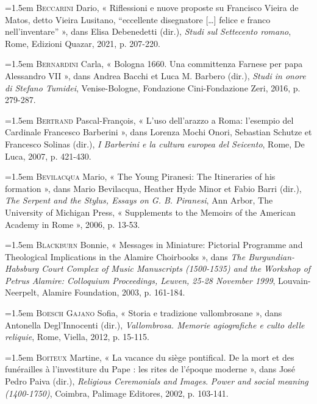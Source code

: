 \documentclass[12pt,twoside,openany]{book}
\newenvironment{PurhBibliography}
  {%
    \par
    \setlength{\parindent}{0pt}%
    \setlength{\leftskip}{0pt}%
  }
  {%
    \par
  }
\begin{document}
\begin{PurhBibliography}
\noindent\hangindent=1.5em \textsc{Beccarini} Dario, « Riflessioni e nuove proposte su Francisco Vieira de Matos, detto Vieira Lusitano, “eccellente disegnatore […] felice e franco nell’inventare” », dans Elisa Debenedetti (dir.), \textit{Studi sul Settecento romano}, Rome, Edizioni Quazar, 2021, p. 207-220.\par
\noindent\hangindent=1.5em \textsc{Bernardini} Carla, « Bologna 1660. Una committenza Farnese per papa Alessandro \textsc{VII} », dans Andrea Bacchi et Luca M. Barbero (dir.), \textit{Studi in onore di Stefano Tumidei}, Venise-Bologne, Fondazione Cini-Fondazione Zeri, 2016, p. 279-287.\par
\noindent\hangindent=1.5em \textsc{Bertrand} Pascal-François, « L’uso dell’arazzo a Roma: l’esempio del Cardinale Francesco Barberini », dans Lorenza Mochi Onori, Sebastian Schutze et Francesco Solinas (dir.), \textit{I Barberini e la cultura europea del Seicento}, Rome, De Luca, 2007, p. 421-430.\par
\noindent\hangindent=1.5em \textsc{Bevilacqua} Mario, « The Young Piranesi: The Itineraries of his formation », dans Mario Bevilacqua, Heather Hyde Minor et Fabio Barri (dir.), \textit{The Serpent and the Stylus, Essays on G. B. Piranesi}, Ann Arbor, The University of Michigan Press, « Supplements to the Memoirs of the American Academy in Rome », 2006, p. 13-53.\par
\noindent\hangindent=1.5em \textsc{Blackburn} Bonnie, « Messages in Miniature: Pictorial Programme and Theological Implications in the Alamire Choirbooks », dans \textit{The Burgundian-Habsburg Court Complex of Music Manuscripts (1500-1535) and the Workshop of Petrus Alamire: Colloquium Proceedings, Leuven, 25-28 November 1999}, Louvain-Neerpelt, Alamire Foundation, 2003, p. 161-184.\par
\noindent\hangindent=1.5em \textsc{Boesch Gajano} Sofia, « Storia e tradizione vallombrosane », dans Antonella Degl’Innocenti (dir.), \textit{Vallombrosa. Memorie agiografiche e culto delle reliquie}, Rome, Viella, 2012, p. 15-115.\par
\noindent\hangindent=1.5em \textsc{Boiteux} Martine, « La vacance du siège pontifical. De la mort et des funérailles à l’investiture du Pape : les rites de l’époque moderne », dans José Pedro Paiva (dir.), \textit{Religious Ceremonials and Images}. \textit{Power and social meaning (1400-1750)}, Coimbra, Palimage Editores, 2002, p. 103-141.\par

\end{PurhBibliography}
\end{document}
